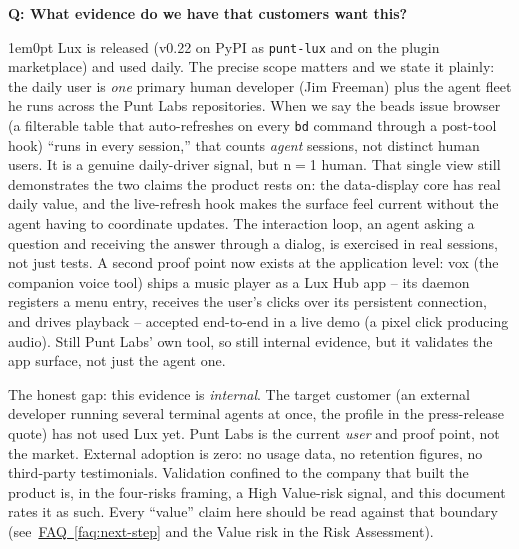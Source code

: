 \documentclass[11pt,letterpaper]{article}
\newcounter{faqnum}
\newenvironment{faqpair}[1]{%
  \needspace{4\baselineskip}%
  \vspace{0.5em}%
  \refstepcounter{faqnum}%
  \noindent\textbf{\color{SectionBlue}Q\thefaqnum: #1}\par\nopagebreak[4]%
  \vspace{0.2em}%
  \begin{adjustwidth}{1em}{0pt}%
  \setlength{\parindent}{0pt}%
}{%
  \end{adjustwidth}%
  \vspace{0.5em}%
}
\newcommand{\faqref}[1]{\hyperref[#1]{FAQ~\ref*{#1}}}
\begin{document}
\begin{faqpair}{What evidence do we have that customers want this?}\label{faq:evidence}
  Lux is released (v0.22 on PyPI as \texttt{punt-lux} and on the plugin
  marketplace) and used daily. The precise scope matters and we state it
  plainly: the daily user is \emph{one} primary human developer (Jim Freeman)
  plus the agent fleet he runs across the Punt Labs repositories. When we say the
  beads issue browser (a filterable table that auto-refreshes on every
  \texttt{bd} command through a post-tool hook) ``runs in every session,''
  that counts \emph{agent} sessions, not distinct human users. It is a genuine
  daily-driver signal, but n${=}$1 human. That single view still demonstrates the
  two claims the product rests on: the data-display core has real daily value,
  and the live-refresh hook makes the surface feel current without the agent
  having to coordinate updates. The interaction loop, an agent asking a
  question and receiving the answer through a dialog, is exercised in real
  sessions, not just tests. A second proof point now exists at the application
  level: vox (the companion voice tool) ships a music player as a Lux Hub app --
  its daemon registers a menu entry, receives the user's clicks over its
  persistent connection, and drives playback -- accepted end-to-end in a live
  demo (a pixel click producing audio). Still Punt Labs' own tool, so still
  internal evidence, but it validates the app surface, not just the agent one.

  The honest gap: this evidence is \emph{internal}. The target customer (an
  external developer running several terminal agents at once, the profile in the
  press-release quote) has not used Lux yet. Punt Labs is the current
  \emph{user} and proof point, not the market. External adoption is zero: no
  usage data, no retention figures, no third-party testimonials. Validation
  confined to the company that built the product is, in the four-risks framing, a
  High Value-risk signal, and this document rates it as such. Every ``value''
  claim here should be read against that boundary (see~\faqref{faq:next-step} and
  the Value risk in the Risk Assessment).
\end{faqpair}
\end{document}
